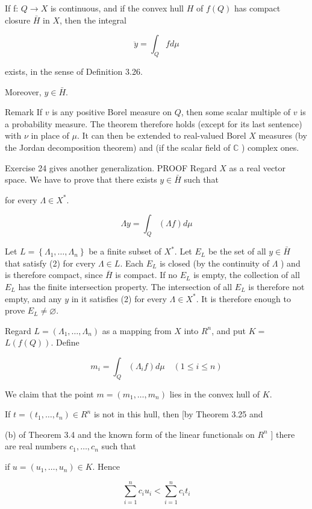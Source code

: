 \documentclass[10pt]{article}
\begin{document}
If f: $Q \rightarrow X$ is continuous, and if the convex hull $H$ of $f(Q)$ has compact closure $\bar{H}$ in $X$, then the integral

$$
\ddot{y}=\int_{Q} f d \mu
$$

exists, in the sense of Definition 3.26.

Moreover, $y \in \bar{H}$.

Remark If $v$ is any positive Borel measure on $Q$, then some scalar multiple of $v$ is a probability measure. The theorem therefore holds (except for its last sentence) with $\nu$ in place of $\mu$. It can then be extended to real-valued Borel $X$ measures (by the Jordan decomposition theorem) and (if the scalar field of
$\mathbb{C}$ ) complex ones.

Exercise 24 gives another generalization. PROOF Regard $X$ as a real vector space. We have to prove that there exists
$y \in \bar{H}$ such that

for every $\Lambda \in X^{*}$.

$$
\Lambda y=\int_{Q}(\Lambda f) d \mu
$$

Let $L=\left\{\Lambda_{1}, \ldots, \Lambda_{n}\right\}$ be a finite subset of $X^{*}$. Let $E_{L}$ be the set of all $y \in \bar{H}$ that satisfy (2) for cvery $\Lambda \in L$. Each $E_{L}$ is closed (by the continuity of $\Lambda$ ) and is therefore compact, since $\bar{H}$ is compact. If no $E_{L}$ is empty, the collection of all $E_{L}$ has the finite intersection property. The intersection of all $E_{L}$ is therefore not empty, and any $y$ in it satisfies (2) for every $\Lambda \in X^{*}$. It is therefore enough to prove $E_{L} \neq \varnothing$.

Regard $L=\left(\Lambda_{1}, \ldots, \Lambda_{n}\right)$ as a mapping from $X$ into $R^{n}$, and put $K=$ $L(f(Q))$. Define

$$
m_{i}=\int_{Q}\left(\Lambda_{i} f\right) d \mu \quad(1 \leq i \leq n)
$$

We claim that the point $m=\left(m_{1}, \ldots, m_{n}\right)$ lies in the convex hull of $K$.

If $t=\left(t_{1}, \ldots, t_{n}\right) \in R^{n}$ is not in this hull, then [by Theorem 3.25 and

(b) of Theorem 3.4 and the known form of the linear functionals on $R^{n}$ ] there are real numbers $c_{1}, \ldots, c_{n}$ such that

if $u=\left(u_{1}, \ldots, u_{n}\right) \in K$. Hence

$$
\sum_{i=1}^{n} c_{i} u_{i}<\sum_{i=1}^{n} c_{i} t_{i}
$$
\end{document}
